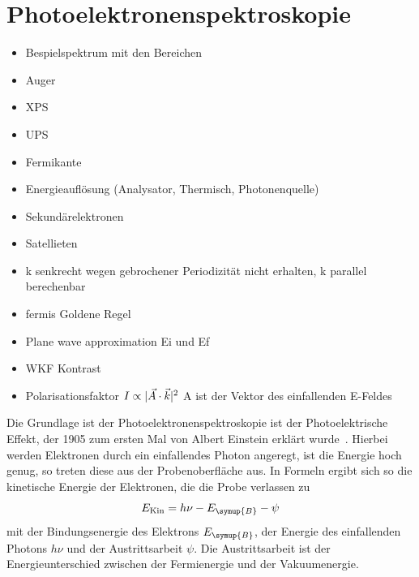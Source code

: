     \section{Photoelektronenspektroskopie} \label{sec:PES}
        \begin{itemize}
            \item Bespielspektrum mit den Bereichen
            \item Auger
            \item XPS
            \item UPS
            \item Fermikante
            \item Energieauflösung (Analysator, Thermisch, Photonenquelle)
            \item Sekundärelektronen
            \item Satellieten
            \item k senkrecht wegen gebrochener Periodizität nicht erhalten, k parallel berechenbar
            \item fermis Goldene Regel
            \item Plane wave approximation Ei und Ef
            \item WKF Kontrast
            \item Polarisationsfaktor $I \propto \lvert\vec{A} \cdot \vec{k}\rvert^2$ A ist der Vektor des einfallenden E-Feldes
        \end{itemize}
        Die Grundlage ist der Photoelektronenspektroskopie ist der Photoelektrische Effekt, der 1905 zum ersten Mal von Albert Einstein erklärt wurde~\cite{Einstein}.
        Hierbei werden Elektronen durch ein einfallendes Photon angeregt, ist die Energie hoch genug, so treten diese aus der Probenoberfläche aus.
        In Formeln ergibt sich so die kinetische Energie der Elektronen, die die Probe verlassen zu 
        \begin{equation}
            E_{\text{Kin}} = h \nu - E_{\symup{B}} - \psi
            \label{eqn:Photoeffekt}
        \end{equation}
        mit der Bindungsenergie des Elektrons $E_{\symup{B}}$, der Energie des einfallenden Photons $h \nu$ und der Austrittsarbeit $\psi$.
        Die Austrittsarbeit ist der Energieunterschied zwischen der Fermienergie und der Vakuumenergie.

